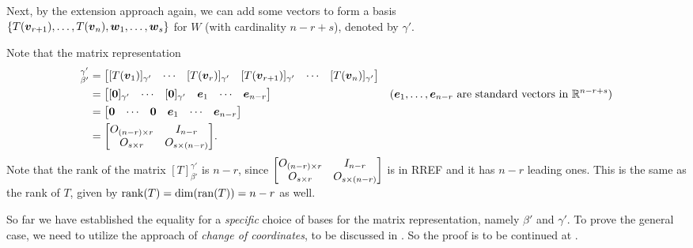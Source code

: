 \begin{enumerate}
\begin{pf}
Next, by the extension approach again, we can add some vectors to form a
basis\\
\(\{T(\vb*{v}_{r+1}),\dotsc,T(\vb*{v}_n),\vb*{w}_1,\dotsc,\vb*{w}_s\}\) for
\(W\) (with cardinality \(n-r+s\)), denoted by \(\gamma'\).

Note that the matrix representation
\begin{align*}
[T]_{\beta'}^{\gamma'}
&=\mqty[
[T(\vect{v}_1)]_{\gamma'}&\cdots&[T(\vect{v}_r)]_{\gamma'}
&[T(\vect{v}_{r+1})]_{\gamma'}&\cdots&[T(\vect{v}_{n})]_{\gamma'}
] \\
&=\mqty[
[\vect{0}]_{\gamma'}&\cdots&[\vect{0}]_{\gamma'}
&\vect{e}_1&\cdots&\vect{e}_{n-r}
]
&\text{(\(\vect{e}_1,\dotsc,\vect{e}_{n-r}\) are standard vectors in \(\R^{n-r+s}\))} \\
&=\mqty[
\vect{0}&\cdots&\vect{0}
&\vect{e}_1&\cdots&\vect{e}_{n-r}
] \\
&=\mqty[
O_{(n-r)\times r}&I_{n-r}\\
O_{s\times r}&O_{s\times (n-r)}
].
\end{align*}
Note that the rank of the matrix \([T]_{\beta'}^{\gamma'}\) is \(n-r\), since
\(\mqty[ O_{(n-r)\times r}&I_{n-r}\\ O_{s\times r}&O_{s\times (n-r)} ]\) is in
RREF and it has \(n-r\) leading ones. This is the same as the rank of \(T\),
given by \(\operatorname{rank}(T)=\dim(\operatorname{ran}(T))=n-r\) as well.

So far we have established the equality for a \emph{specific} choice of bases
for the matrix representation, namely \(\beta'\) and \(\gamma'\). To prove the
general case, we need to utilize the approach of \emph{change of coordinates},
to be discussed in . So the proof is to be continued
at .
\end{pf}
\end{enumerate}
